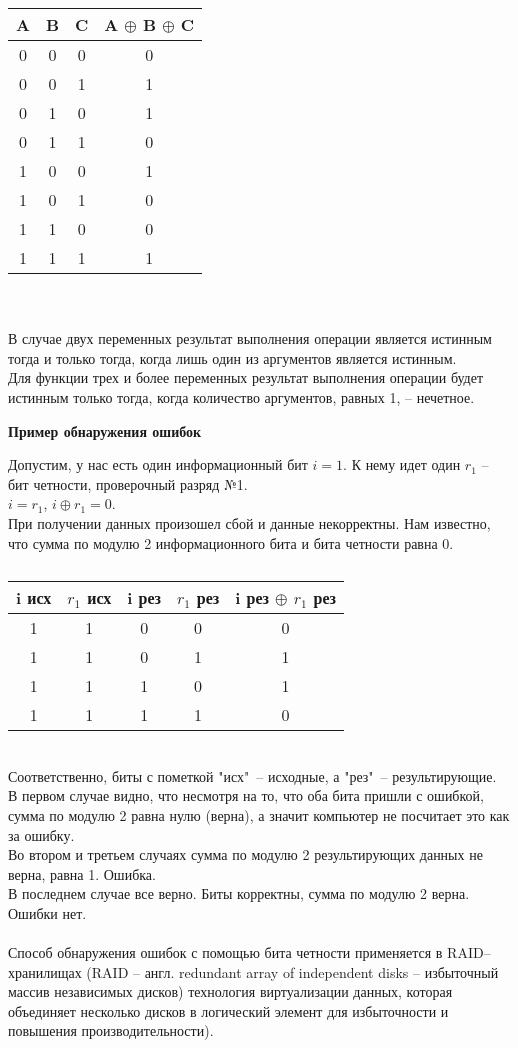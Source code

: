 \begin{minipage}[l]{6cm}
\begin{tabular}{|c|c|c|c|}
\hline
A & B & C & A $\oplus$ B $\oplus$ C\\
\hline
0 & 0 & 0 & 0 \\
0 & 0 & 1 & 1 \\
0 & 1 & 0 & 1 \\
0 & 1 & 1 & 0 \\
1 & 0 & 0 & 1 \\
1 & 0 & 1 & 0 \\
1 & 1 & 0 & 0 \\
1 & 1 & 1 & 1 \\
\hline
\end{tabular}
\end{minipage}
\\
\\В случае двух переменных результат выполнения операции является истинным тогда и только тогда, когда лишь один из аргументов является истинным.
\\Для функции трех и более переменных результат выполнения операции будет истинным только тогда, когда количество аргументов, равных 1, -- нечетное.
\begin{center}
  \textbf{Пример обнаружения ошибок}
\end{center}
Допустим, у нас есть один информационный бит $i = 1$. К нему идет один $r_1$ -- бит четности, проверочный разряд №1.
\\$i = r_1$, $i \oplus r_1 = 0$.
\\При получении данных произошел сбой и данные некорректны. Нам известно, что сумма по модулю 2 информационного бита и бита четности равна 0.
\begin{table}[h]
\caption{}
\begin{tabular}{|c|c|c|c|c|}
\hline
i исх & $r_{1}$ исх & i рез & $r_{1}$ рез & i рез $\oplus$ $r_{1}$ рез \\
\hline
1 & 1 & 0 & 0 & 0 \\
1 & 1 & 0 & 1 & 1 \\
1 & 1 & 1 & 0 & 1 \\
1 & 1 & 1 & 1 & 0 \\
\hline
\end{tabular}
\end{table}
\\Соответственно, биты с пометкой "исх"\ -- исходные, а "рез"\ -- результирующие.
\\В первом случае видно, что несмотря на то, что оба бита пришли с ошибкой, сумма по модулю 2 равна нулю (верна), а значит компьютер не посчитает это как за ошибку.
\\Во втором и третьем случаях сумма по модулю 2 результирующих данных не верна, равна 1. Ошибка.
\\В последнем случае все верно. Биты корректны, сумма по модулю 2 верна. Ошибки нет.
\\
\\Способ обнаружения ошибок с помощью бита четности применяется в RAID--хранилищах (RAID -- англ. redundant array of independent disks -- избыточный массив независимых дисков) технология виртуализации данных, которая объединяет несколько дисков в логический элемент для избыточности и повышения производительности).

